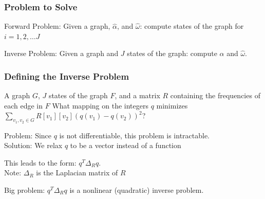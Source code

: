 \begin{frame}[t]
    \frametitle{Problem to Solve}
    \begin{center}
	\end{center}

    Forward Problem: Given a graph, $\hat{\alpha}$, and $\hat{\omega}$: compute states of the graph for $i=1,2, \dots J$
    
    \vspace{1.0em}
    Inverse Problem: Given a graph and $J$ states of the graph: compute $\hat{\alpha}$ and $\hat{\omega}$.
    
\end{frame}

\begin{frame}[t]

    \frametitle{Defining the Inverse Problem}
    
	{A graph $G$, $J$ states of the graph $F$, and a matrix $R$ containing the frequencies of each edge in $F$}
	{What mapping on the integers $q$ minimizes $\sum_{v_1,v_2 \in G}R[v_1][v_2](q(v_1) - q(v_2))^2$?}

     {
        Problem: Since $q$ is not differentiable, this problem is intractable.\\
        Solution: We relax $q$ to be a vector instead of a function
    }

     {
        \vspace{1.2em}
        This leads to the form: $q^T\Delta_Rq$.\\
        Note: $\Delta_R$ is the Laplacian matrix of $R$
    }

     {
        \vspace{1.2em}
        Big problem: $q^T\Delta_Rq$ is a nonlinear (quadratic) inverse problem.
    }

\end{frame}

